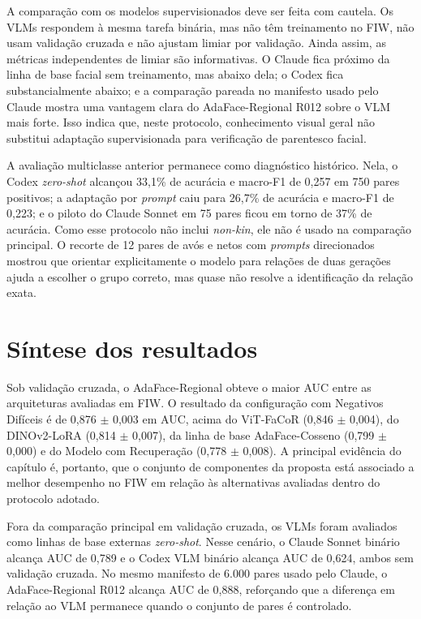 A comparação com os modelos supervisionados deve ser feita com cautela. Os VLMs respondem à mesma tarefa binária, mas não têm treinamento no FIW, não usam validação cruzada e não ajustam limiar por validação. Ainda assim, as métricas independentes de limiar são informativas. O Claude fica próximo da linha de base facial sem treinamento, mas abaixo dela; o Codex fica substancialmente abaixo; e a comparação pareada no manifesto usado pelo Claude mostra uma vantagem clara do AdaFace-Regional R012 sobre o VLM mais forte. Isso indica que, neste protocolo, conhecimento visual geral não substitui adaptação supervisionada para verificação de parentesco facial.

A avaliação multiclasse anterior permanece como diagnóstico histórico. Nela, o Codex \textit{zero-shot} alcançou 33,1\% de acurácia e macro-F1 de 0,257 em 750 pares positivos; a adaptação por \textit{prompt} caiu para 26,7\% de acurácia e macro-F1 de 0,223; e o piloto do Claude Sonnet em 75 pares ficou em torno de 37\% de acurácia. Como esse protocolo não inclui \textit{non-kin}, ele não é usado na comparação principal. O recorte de 12 pares de avós e netos com \textit{prompts} direcionados mostrou que orientar explicitamente o modelo para relações de duas gerações ajuda a escolher o grupo correto, mas quase não resolve a identificação da relação exata.

\section{Síntese dos resultados}

Sob validação cruzada, o AdaFace-Regional obteve o maior AUC entre as arquiteturas avaliadas em FIW. O resultado da configuração com Negativos Difíceis é de 0,876 $\pm$ 0,003 em AUC, acima do ViT-FaCoR (0,846 $\pm$ 0,004), do DINOv2-LoRA (0,814 $\pm$ 0,007), da linha de base AdaFace-Cosseno (0,799 $\pm$ 0,000) e do Modelo com Recuperação (0,778 $\pm$ 0,008). A principal evidência do capítulo é, portanto, que o conjunto de componentes da proposta está associado a melhor desempenho no FIW em relação às alternativas avaliadas dentro do protocolo adotado.

Fora da comparação principal em validação cruzada, os VLMs foram avaliados como linhas de base externas \textit{zero-shot}. Nesse cenário, o Claude Sonnet binário alcança AUC de 0,789 e o Codex VLM binário alcança AUC de 0,624, ambos sem validação cruzada. No mesmo manifesto de 6.000 pares usado pelo Claude, o AdaFace-Regional R012 alcança AUC de 0,888, reforçando que a diferença em relação ao VLM permanece quando o conjunto de pares é controlado.

